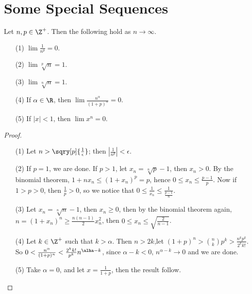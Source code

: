 \section{Some Special Sequences}\label{section_3.5}

\begin{theorem}\label{3.5.1}
    Let $n, p \in \Z^+$. Then the following hold as  $n \rightarrow \infty$.
        \begin{enumerate}
            \item[(1)] $\lim{\frac{1}{n^p}}=0$.

            \item[(2)] $\lim{\sqrt[p]{n}}=1$.

            \item[(3)] $\lim{\sqrt[n]{n}}=1$.

            \item[(4)] If $\alpha \in \R$, then  $\lim{\frac{n^{\alpha}}{(1+p)^n}}=0$.

            \item[(5)] If $|x|<1$, then  $\lim{x^n}=0$.
        \end{enumerate}
\end{theorem}
\begin{proof}
   \begin{enumerate}
       \item[(1)] Let $n>\sqry[p]{\frac{1}{\epsilon}}$; then $|\frac{1}{n^p}|<\epsilon$.

       \item[(2)] If $p=1$, we are done. If  $p>1$, let  $x_n=\sqrt[n]{p}-1$, then  $x_n>0$.
           By the binomial theorem, $1+nx_n \leq (1+x_n)^p=p$, hence $0 \leq x_n \leq \frac{p-1}{p}$.
           Now if $1>p>0$, then  $ \frac{1}{p}>0$, so we notice that $0 \leq \frac{1}{x_n} \leq \frac{1}{\frac{p-1}{n}}$.

       \item[(3)] Let $x_n=\sqrt[n]{n}-1$, then  $x_n \geq 0$, then by the binomial theorem again,
           $n=(1+x_n)^n \geq \frac{n(n-1)}{2}x_n^2$, then $0 \leq x_n \leq \sqrt{\frac{2}{n-1}}$.

       \item[(4)] Let $k \in \Z^+$ such that  $k>\alpha$. Then  $n>2k$,let  $(1+p)^n> {n \choose k}p^k>
           \frac{n^kp^k}{2^kk!}$. So $0<\frac{n^{\alpha}}{(1+p)^n}<\frac{2^kk!}{p^k}n^{\alha-k}$, since
           $\alpha-k<0$,  $n^{\alpha-k} \rightarrow 0$ and we are done.

       \item[(5)] Take  $\alpha=0$, and let  $x=\frac{1}{1+p}$, then the result follow.
   \end{enumerate}
\end{proof}
